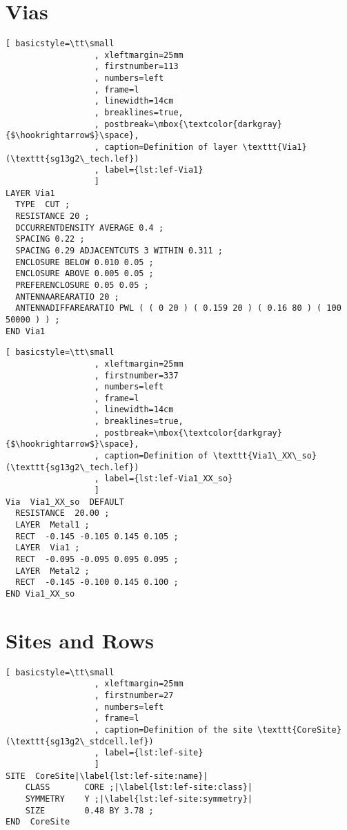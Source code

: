 \documentclass{article}[11pt]
\begin{document}
\section{Vias}

\begin{lstlisting}[ basicstyle=\tt\small
                  , xleftmargin=25mm
                  , firstnumber=113
                  , numbers=left
                  , frame=l
                  , linewidth=14cm
                  , breaklines=true,
                  , postbreak=\mbox{\textcolor{darkgray}{$\hookrightarrow$}\space},
                  , caption=Definition of layer \texttt{Via1} (\texttt{sg13g2\_tech.lef})
                  , label={lst:lef-Via1}
                  ]
LAYER Via1
  TYPE  CUT ;
  RESISTANCE 20 ;
  DCCURRENTDENSITY AVERAGE 0.4 ;
  SPACING 0.22 ;
  SPACING 0.29 ADJACENTCUTS 3 WITHIN 0.311 ;
  ENCLOSURE BELOW 0.010 0.05 ;
  ENCLOSURE ABOVE 0.005 0.05 ;
  PREFERENCLOSURE 0.05 0.05 ;
  ANTENNAAREARATIO 20 ;
  ANTENNADIFFAREARATIO PWL ( ( 0 20 ) ( 0.159 20 ) ( 0.16 80 ) ( 100 50000 ) ) ;
END Via1
\end{lstlisting}


\begin{lstlisting}[ basicstyle=\tt\small
                  , xleftmargin=25mm
                  , firstnumber=337
                  , numbers=left
                  , frame=l
                  , linewidth=14cm
                  , breaklines=true,
                  , postbreak=\mbox{\textcolor{darkgray}{$\hookrightarrow$}\space},
                  , caption=Definition of \texttt{Via1\_XX\_so} (\texttt{sg13g2\_tech.lef})
                  , label={lst:lef-Via1_XX_so}
                  ]
Via  Via1_XX_so  DEFAULT
  RESISTANCE  20.00 ;
  LAYER  Metal1 ;
  RECT  -0.145 -0.105 0.145 0.105 ;
  LAYER  Via1 ;
  RECT  -0.095 -0.095 0.095 0.095 ;
  LAYER  Metal2 ;
  RECT  -0.145 -0.100 0.145 0.100 ;
END Via1_XX_so
\end{lstlisting}


\section{Sites and Rows}

\begin{lstlisting}[ basicstyle=\tt\small
                  , xleftmargin=25mm
                  , firstnumber=27
                  , numbers=left
                  , frame=l
                  , caption=Definition of the site \texttt{CoreSite} (\texttt{sg13g2\_stdcell.lef})
                  , label={lst:lef-site}
                  ]
SITE  CoreSite|\label{lst:lef-site:name}|
    CLASS       CORE ;|\label{lst:lef-site:class}|
    SYMMETRY    Y ;|\label{lst:lef-site:symmetry}|
    SIZE        0.48 BY 3.78 ;
END  CoreSite
\end{lstlisting}
\end{document}

